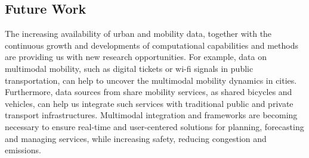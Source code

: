 \subsection*{Future Work}

The increasing availability of urban and mobility data, together with the continuous growth and developments of computational capabilities and methods are providing us with new research opportunities. For example, data on multimodal mobility, such as digital tickets or wi-fi signals in public transportation, can help to uncover the multimodal mobility dynamics in cities. Furthermore, data sources from share mobility services, as shared bicycles and vehicles, can help us integrate such services with traditional public and private transport infrastructures. Multimodal integration and frameworks are becoming necessary to ensure real-time and user-centered solutions for planning, forecasting and managing services, while increasing safety, reducing congestion and emissions.




